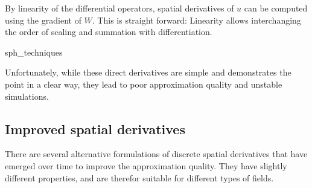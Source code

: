By linearity of the differential operators, spatial derivatives of $u$ can be
computed using the gradient of $W$.
This is straight forward: Linearity allows interchanging the order of
scaling and summation with differentiation.
\begin{ceq}{sph_techniques}
\def\arraystretch{3}
\end{ceq}
Unfortunately, while these direct derivatives are simple and
demonstrates the point in a clear way, they lead to poor approximation
quality and unstable simulations.
\cite{sph_techniques}

\subsection{Improved spatial derivatives}
There are several alternative formulations of
discrete spatial derivatives that have emerged over time
to improve the approximation quality.
They have slightly different properties, and are therefor suitable
for different types of fields.

